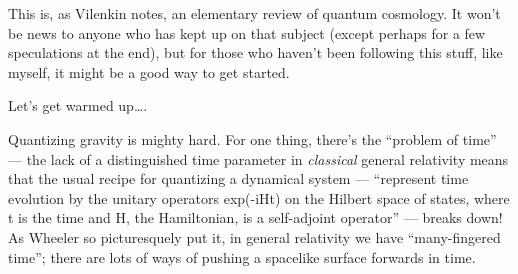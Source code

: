 \documentclass{article}
\begin{document}
This is, as Vilenkin notes, an elementary review of quantum cosmology.
It won't be news to anyone who has kept up on that subject (except
perhaps for a few speculations at the end), but for those who haven't
been following this stuff, like myself, it might be a good way to get
started.

Let's get warmed up\ldots.

Quantizing gravity is mighty hard. For one thing, there's the ``problem
of time'' --- the lack of a distinguished time parameter in
\emph{classical} general relativity means that the usual recipe for
quantizing a dynamical system --- ``represent time evolution by the
unitary operators exp(-iHt) on the Hilbert space of states, where t is
the time and H, the Hamiltonian, is a self-adjoint operator'' --- breaks
down! As Wheeler so picturesquely put it, in general relativity we have
``many-fingered time''; there are lots of ways of pushing a spacelike
surface forwards in time.
\end{document}
